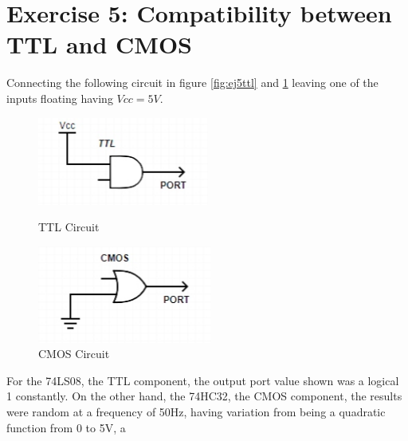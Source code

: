 



%
%
%

\section{\color{olive}Exercise 5: Compatibility between TTL and CMOS}

Connecting the following circuit in figure \ref{fig:ej5ttl} and \ref{fig:ej5cmos} leaving one of the inputs floating having $Vcc = 5V$. 

\begin{figure}[h!]
         \begin{minipage}{.47\linewidth}
        \centering
        \includegraphics[width=.6\linewidth]{./TTL5.png}
        \caption{\color{cyan}TTL Circuit}
        \label{fig:ej5ttl}
        \end{minipage}
         \begin{minipage}{.5\linewidth}
        \centering
        \includegraphics[width=.5\linewidth]{./CMOS5.png}
        \caption{\color{cyan}CMOS Circuit}
        \label{fig:ej5cmos}
    \end{minipage}
\end{figure}

For the 74LS08, the TTL component, the output port value shown was a logical 1 constantly. On the other hand, the 74HC32, the CMOS component, the results were random at a frequency of 50Hz, having variation from being a quadratic function from 0 to 5V, a 

